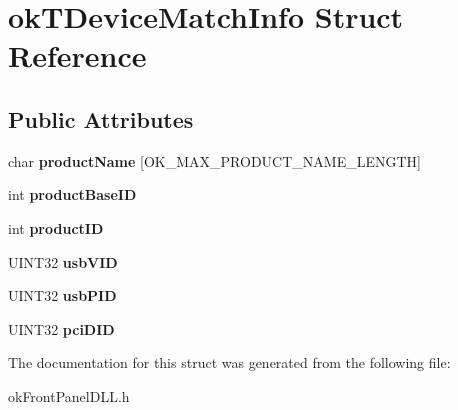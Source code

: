 \hypertarget{structokTDeviceMatchInfo}{\section{ok\+T\+Device\+Match\+Info Struct Reference}
\label{structokTDeviceMatchInfo}
}
\subsection*{Public Attributes}
\begin{DoxyCompactItemize}
\item 
\hypertarget{structokTDeviceMatchInfo_a76a6e12ee155d8257b818c968fa9a12c}{char {\bfseries product\+Name} \mbox{[}O\+K\+\_\+\+M\+A\+X\+\_\+\+P\+R\+O\+D\+U\+C\+T\+\_\+\+N\+A\+M\+E\+\_\+\+L\+E\+N\+G\+T\+H\mbox{]}}\label{structokTDeviceMatchInfo_a76a6e12ee155d8257b818c968fa9a12c}

\item 
\hypertarget{structokTDeviceMatchInfo_afcda2b41f2d3202f07abce2508264198}{int {\bfseries product\+Base\+I\+D}}\label{structokTDeviceMatchInfo_afcda2b41f2d3202f07abce2508264198}

\item 
\hypertarget{structokTDeviceMatchInfo_a85dd7347295273f03c732c0ccb68dcd8}{int {\bfseries product\+I\+D}}\label{structokTDeviceMatchInfo_a85dd7347295273f03c732c0ccb68dcd8}

\item 
\hypertarget{structokTDeviceMatchInfo_a06d93da4e6dc3943739d7da9d3f1ab15}{U\+I\+N\+T32 {\bfseries usb\+V\+I\+D}}\label{structokTDeviceMatchInfo_a06d93da4e6dc3943739d7da9d3f1ab15}

\item 
\hypertarget{structokTDeviceMatchInfo_a2669b2bd9c27ad2effe2435a5e7007a6}{U\+I\+N\+T32 {\bfseries usb\+P\+I\+D}}\label{structokTDeviceMatchInfo_a2669b2bd9c27ad2effe2435a5e7007a6}

\item 
\hypertarget{structokTDeviceMatchInfo_aa957fa4f2c651c933c5e0a029852b6da}{U\+I\+N\+T32 {\bfseries pci\+D\+I\+D}}\label{structokTDeviceMatchInfo_aa957fa4f2c651c933c5e0a029852b6da}

\end{DoxyCompactItemize}


The documentation for this struct was generated from the following file\+:\begin{DoxyCompactItemize}
\item 
ok\+Front\+Panel\+D\+L\+L.\+h\end{DoxyCompactItemize}
